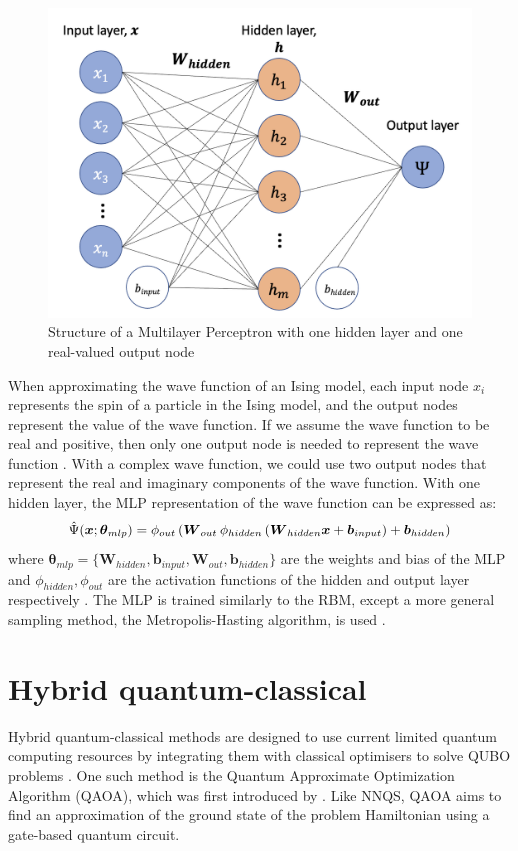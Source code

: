 \begin{figure}[htb!]
    \centering
    \includegraphics[width=0.6\linewidth]{images/mlp_diagram.png}
    \caption{Structure of a Multilayer Perceptron with one hidden layer and one real-valued output node}
    \label{rbmstructure}
\end{figure}
When approximating the wave function of an Ising model, each input node $x_i$ represents the spin of a particle in the Ising model, and the output nodes represent the value of the wave function. If we assume the wave function to be real and positive, then only one output node is needed to represent the wave function \cite{b20}. With a complex wave function, we could use two output nodes that represent the real and imaginary components of the wave function. With one hidden layer, the MLP representation of the wave function can be expressed as:
\begin{equation}
    \Hat{\Psi}(\boldsymbol{x}; \boldsymbol{\theta}_{mlp}) = 
    \phi_{out} \left(
    \boldsymbol{W}_{out} \hspace{2pt}
    \phi_{hidden} \left( \boldsymbol{W}_{hidden}\boldsymbol{x} + \boldsymbol{b}_{input} \right) + \boldsymbol{b}_{hidden} \right)
\end{equation}
where  $\boldsymbol{\theta}_{mlp} = \{\boldsymbol{W}_{hidden}, \boldsymbol{b}_{input}, \boldsymbol{W}_{out}, \boldsymbol{b}_{hidden}\}$ are the weights and bias of the MLP and $\phi_{hidden}, \phi_{out}$ are the activation functions of the hidden and output layer respectively \cite{b20}. The MLP is trained similarly to the RBM, except a more general sampling method, the Metropolis-Hasting algorithm, is used \cite{b25}.

\section{Hybrid quantum-classical}
Hybrid quantum-classical methods are designed to use current limited quantum computing resources by integrating them with classical optimisers to solve QUBO problems \cite{b32}. One such method is the Quantum Approximate Optimization Algorithm (QAOA), which was first introduced by . Like NNQS, QAOA aims to find an approximation of the ground state of the problem Hamiltonian using a gate-based quantum circuit.

